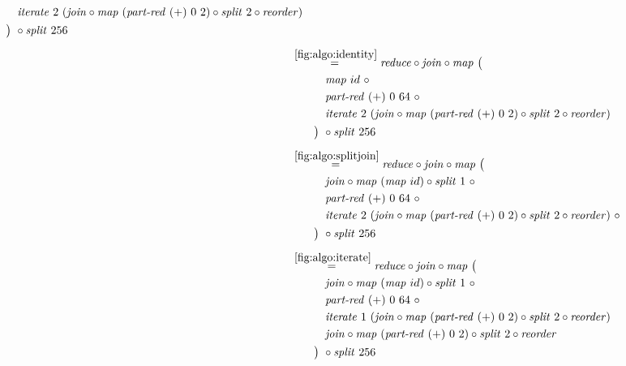 \begin{align*}
\begin{aligned}
    &\qquad\quad\iterateN\ 2\ (\join \circ \map\ (\partRed\ (+)\ 0\ 2) \circ \splitN\ 2 \circ \reorder)\\
    &\qquad\big)\ \circ \splitN\ 256
  \end{aligned}\\[.5em]
%
  &\hspace{-2em}\quad\begin{aligned}
    &\overset{\ref{fig:algo:identity}}{=\hspace{.2em}}
      \reduce \circ \join \circ \map\ \big(\\
    &\qquad\quad\map\ id\ \circ \\
    &\qquad\quad\partRed\ (+)\ 0\ 64\ \circ\\
    &\qquad\quad\iterateN\ 2\ (\join \circ \map\ (\partRed\ (+)\ 0\ 2) \circ \splitN\ 2\circ \reorder)\\
    &\qquad\big)\ \circ \splitN\ 256
  \end{aligned}\\[.5em]
%
  &\hspace{-2em}\quad\begin{aligned}
    &\overset{\ref{fig:algo:splitjoin}}{=\hspace{.2em}}
      \reduce \circ \join \circ \map\ \big(\\
    &\qquad\quad\join \circ \map\ (\map\ id) \circ \splitN\ 1\ \circ\\
    &\qquad\quad\partRed\ (+)\ 0\ 64\ \circ\\
    &\qquad\quad\iterateN\ 2\ (\join \circ \map\ (\partRed\ (+)\ 0\ 2) \circ \splitN\ 2\circ \reorder)\ \circ\\
    &\qquad\big)\ \circ \splitN\ 256
  \end{aligned}\\[.5em]
%
  &\hspace{-2em}\quad\begin{aligned}
    &\overset{\ref{fig:algo:iterate}}{=\hspace{.2em}}
      \reduce \circ \join \circ \map\ \big(\\
    &\qquad\quad\join \circ \map\ (\map\ id) \circ \splitN\ 1\ \circ\\
    &\qquad\quad\partRed\ (+)\ 0\ 64\ \circ\\
    &\qquad\quad\iterateN\ 1\ (\join \circ \map\ (\partRed\ (+)\ 0\ 2) \circ \splitN\ 2\circ \reorder)\\
    &\qquad\quad\join \circ \map\ (\partRed\ (+)\ 0\ 2) \circ \splitN\ 2\circ \reorder\\
    &\qquad\big)\ \circ \splitN\ 256
  \end{aligned}\\[.5em]
%
\end{align*}

